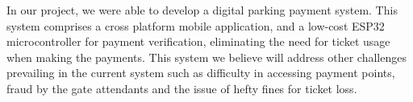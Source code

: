 In our project, we were able to develop a digital parking payment system. This system comprises a cross platform mobile application, and a low-cost ESP32 microcontroller for payment verification, eliminating the need for ticket usage when making the payments. This system we believe will address other challenges prevailing in the current system such as difficulty in accessing payment points, fraud by the gate attendants and the issue of hefty fines for ticket loss.
